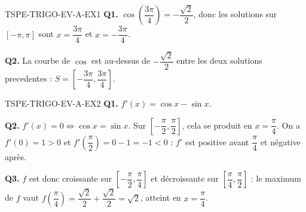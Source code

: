 \begin{corrige}{TSPE-TRIGO-EV-A-EX1}
\textbf{Q1.} $\cos\!\left(\dfrac{3\pi}{4}\right) = -\dfrac{\sqrt{2}}{2}$, donc les solutions sur $[-\pi,\pi]$ sont $x=\dfrac{3\pi}{4}$ et $x=-\dfrac{3\pi}{4}$.

\textbf{Q2.} La courbe de $\cos$ est au-dessus de $-\dfrac{\sqrt{2}}{2}$ entre les deux solutions precedentes : $S = \left[-\dfrac{3\pi}{4}, \dfrac{3\pi}{4}\right]$.
\end{corrige}

\begin{corrige}{TSPE-TRIGO-EV-A-EX2}
\textbf{Q1.} $f'(x) = \cos x - \sin x$.

\textbf{Q2.} $f'(x)=0 \iff \cos x = \sin x$. Sur $\left[-\dfrac{\pi}{2},\dfrac{\pi}{2}\right]$, cela se produit en $x=\dfrac{\pi}{4}$. On a $f'(0)=1>0$ et $f'\!\left(\dfrac{\pi}{2}\right)=0-1=-1<0$ : $f'$ est positive avant $\dfrac{\pi}{4}$ et négative après.

\textbf{Q3.} $f$ est donc croissante sur $\left[-\dfrac{\pi}{2},\dfrac{\pi}{4}\right]$ et décroissante sur $\left[\dfrac{\pi}{4},\dfrac{\pi}{2}\right]$ : le maximum de $f$ vaut $f\!\left(\dfrac{\pi}{4}\right) = \dfrac{\sqrt{2}}{2}+\dfrac{\sqrt{2}}{2} = \sqrt{2}$, atteint en $x=\dfrac{\pi}{4}$.
\end{corrige}
